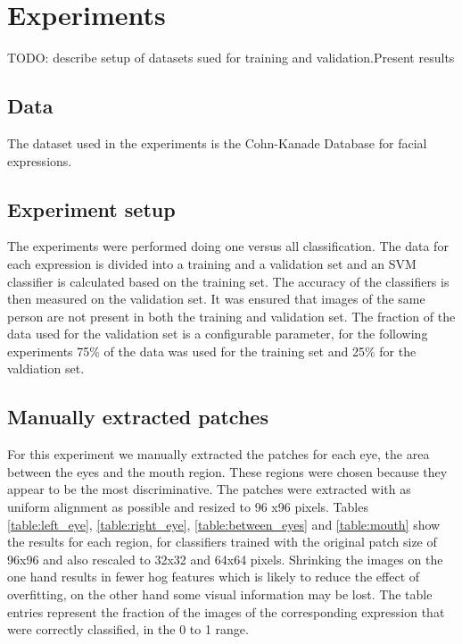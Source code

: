\section{Experiments}

TODO: describe setup of datasets sued for training and validation.Present results

\subsection{Data}

The dataset used in the experiments is the Cohn-Kanade Database for facial expressions.\nocite{Kanade2000CK+}\nocite{Lucey2010CK+}

\subsection{Experiment setup}
The experiments were performed doing one versus all classification. The data for each expression is divided into a training and a validation set and an SVM
classifier is calculated based on the training set. The accuracy of the classifiers is then measured on the validation set. It was ensured that images of the same
person are not present in both the training and validation set. The fraction of the data used for the validation set is a configurable parameter, for the 
following experiments 75\% of the data was used for the training set and 25\% for the valdiation set. 

\subsection{Manually extracted patches}
For this experiment we manually extracted the patches for each eye, the area between the eyes and the mouth region. These regions were chosen because they 
appear to be the most discriminative. The patches were extracted with as uniform alignment as possible and resized to 96 x96 pixels. 
Tables \ref{table:left_eye}, \ref{table:right_eye}, \ref{table:between_eyes} and \ref{table:mouth} show the results for each region, for classifiers trained 
with the original patch size of 96x96 and also rescaled to 32x32 and 64x64 pixels. Shrinking the images on the one hand results in fewer hog features which
is likely to reduce the effect of overfitting, on the other hand some visual information may be lost. The table entries represent the fraction of the
images of the corresponding expression that were correctly classified, in the 0 to 1 range.

